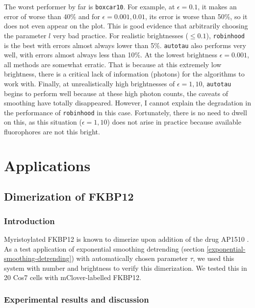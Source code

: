 \documentclass[12pt,]{book}
\theoremstyle{definition}
\theoremstyle{definition}
\theoremstyle{definition}
\theoremstyle{remark}
\begin{document}
The worst performer by far is \texttt{boxcar10}. For example, at
\(\epsilon = 0.1\), it makes an error of worse than 40\% and for
\(\epsilon = 0.001, 0.01\), its error is worse than 50\%, so it does not
even appear on the plot. This is good evidence that arbitrarily choosing
the parameter \(l\) very bad practice. For realistic brightnesses
(\(\le 0.1\)), \texttt{robinhood} is the best with errors almost always
lower than 5\%. \texttt{autotau} also performs very well, with errors
almost always less than 10\%. At the lowest brightness
\(\epsilon = 0.001\), all methods are somewhat erratic. That is because
at this extremely low brightness, there is a critical lack of
information (photons) for the algorithms to work with. Finally, at
unrealistically high brightnesses of \(\epsilon = 1, 10\),
\texttt{autotau} begins to perform well because at these high photon
counts, the caveats of smoothing have totally disappeared. However, I
cannot explain the degradation in the performance of \texttt{robinhood}
in this case. Fortunately, there is no need to dwell on this, as this
situation (\(\epsilon = 1, 10\)) does not arise in practice because
available fluorophores are not this bright.

\chapter{Applications}\label{applications}

\section{Dimerization of FKBP12}\label{dimerization-of-fkbp12}

\subsection{Introduction}\label{introduction}

Myristoylated FKBP12 is known to dimerize upon addition of the drug
AP1510 \citep{Amara}. As a test application of exponential smoothing
detrending (section \ref{exponential-smoothing-detrending}) with
automatically chosen parameter \(\tau\), we used this system with number
and brightness to verify this dimerization. We tested this in 20 Cos7
cells with mClover-labelled FKBP12.

\subsection{Experimental results and
discussion}\label{experimental-results-and-discussion}
\end{document}
